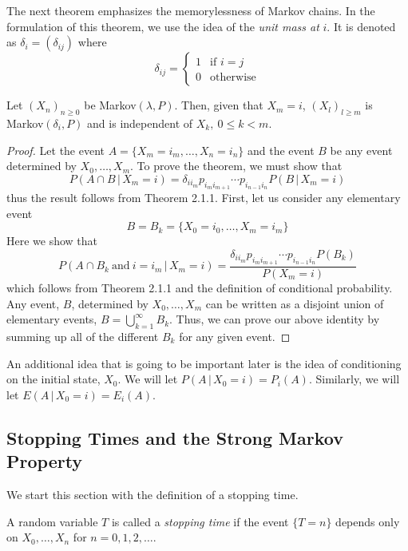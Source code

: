 The next theorem emphasizes the memorylessness of Markov chains. In the formulation of this theorem, we use the idea of the \emph{unit mass at} $i$. It is denoted as $\delta_i = (\delta_{ij})$ where
\[\delta_{ij} = \left\{ \begin{array}{ll}
1 & \textrm{if $i=j$}\\
0 & \textrm{otherwise}
\end{array} \right. \]

\begin{thm} Let $(X_n)_{n \geq 0}$ be Markov$(\lambda,P)$. Then, given that $X_m = i$, $(X_l)_{l \geq m}$ is Markov$(\delta_i,P)$ and is independent of $X_k, \: 0 \leq k < m$.
\end{thm}
\begin{proof} Let the event $A=\{X_m=i_m, \ldots, X_n=i_n\}$ and the event $B$ be any event determined by $X_0, \ldots, X_m$. To prove the theorem, we must show that
\[P(A \cap B \, | \, X_m=i) = \delta_{ii_m}p_{i_mi_{m+1}}\cdots p_{i_{n-1}i_n}P(B\, | \, X_m=i)\]
 thus the result follows from Theorem 2.1.1. First, let us consider any elementary event
\[ B=B_k=\{X_0=i_0, \ldots, X_m=i_m\}\]
Here we show that
\[ P(A \cap B_k \: \textrm{and} \: i=i_m \,|\, X_m=i) = \frac{\delta_{ii_m}p_{i_mi_{m+1}}\cdots p_{i_{n-1}i_n}P(B_k)}{P(X_m=i)}\]
which follows from Theorem 2.1.1 and the definition of conditional probability. Any event, $B$, determined by $X_0, \ldots, X_m$ can be written as a disjoint union of elementary events, $B=\bigcup_{k=1}^{\infty} B_k$. Thus, we can prove our above identity by summing up all of the different $B_k$ for any given event.
\end{proof}

An additional idea that is going to be important later is the idea of conditioning on the initial state, $X_0$. We will let $P(A\,|\,X_0=i) = P_i(A)$. Similarly, we will let $E(A\,|\,X_0=i)=E_i(A)$.

\subsection{Stopping Times and the Strong Markov Property}

We start this section with the definition of a stopping time.
\begin{defn} A random variable $T$ is called a \emph{stopping time} if the event $\{T=n\}$ depends only on $X_0, \ldots, X_n$ for $n=0,1,2,\ldots$.
\end{defn}

